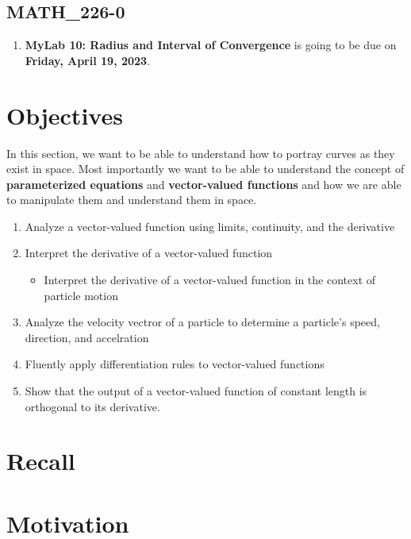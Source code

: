 \documentclass{report}
\begin{document}
\begin{sloppypar}
\begin{enumerate}
\end{enumerate}
\subsection{MATH\_226-0}
\begin{enumerate}
  \item \textbf{MyLab 10: Radius and Interval of
        Convergence} is going to be due on
        \textbf{Friday, April 19, 2023}.
\end{enumerate}


\section{Objectives}
In this section, we want to be able to
understand how to portray curves as they
exist in space. Most importantly we want
to be able to understand the concept of
\textbf{parameterized equations} and
\textbf{vector-valued functions} and
how we are able to manipulate them and
understand them in space.
\begin{enumerate}
  \item Analyze a vector-valued function
        using limits, continuity, and the
        derivative
  \item Interpret the derivative of a
        vector-valued function
        \begin{itemize}
          \item Interpret the derivative of a
                vector-valued function
                in the context of particle
                motion
        \end{itemize}
  \item Analyze the velocity vectror
        of a particle to determine a particle's
        speed, direction, and accelration
  \item Fluently apply differentiation rules
        to vector-valued functions
  \item Show that the output of a
        vector-valued function of constant
        length is orthogonal to its
        derivative.

\end{enumerate}

\section{Recall}

\section{Motivation}


\end{sloppypar}
\end{document}
